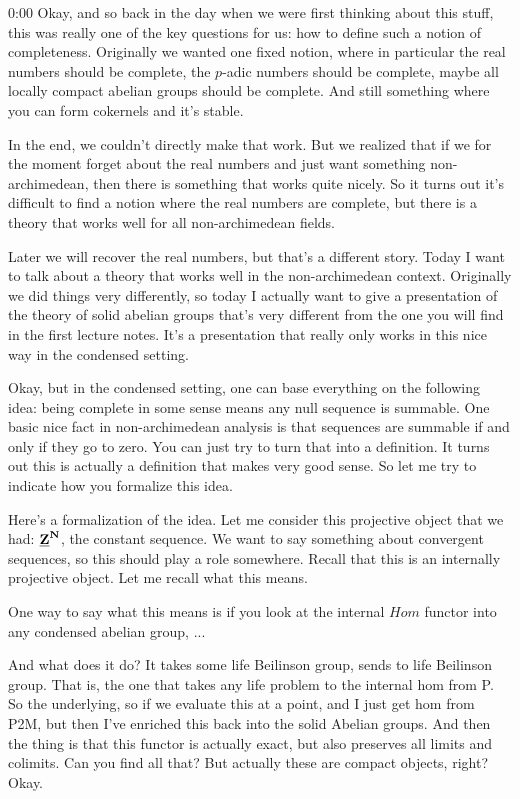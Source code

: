 \begin{unfinished}{0:00}
Okay, and so back in the day when we were first thinking about this stuff, this was really one of the key questions for us: how to define such a notion of completeness. Originally we wanted one fixed notion, where in particular the real numbers should be complete, the $p$-adic numbers should be complete, maybe all locally compact abelian groups should be complete. And still something where you can form cokernels and it's stable.

In the end, we couldn't directly make that work. But we realized that if we for the moment forget about the real numbers and just want something non-archimedean, then there is something that works quite nicely. So it turns out it's difficult to find a notion where the real numbers are complete, but there is a theory that works well for all non-archimedean fields.

Later we will recover the real numbers, but that's a different story. Today I want to talk about a theory that works well in the non-archimedean context. Originally we did things very differently, so today I actually want to give a presentation of the theory of solid abelian groups that's very different from the one you will find in the first lecture notes. It's a presentation that really only works in this nice way in the condensed setting.

Okay, but in the condensed setting, one can base everything on the following idea: being complete in some sense means any null sequence is summable. One basic nice fact in non-archimedean analysis is that sequences are summable if and only if they go to zero. You can just try to turn that into a definition. It turns out this is actually a definition that makes very good sense. So let me try to indicate how you formalize this idea.

Here's a formalization of the idea. Let me consider this projective object that we had: $\underline{\mathbf Z}^\mathbf N$, the constant sequence. We want to say something about convergent sequences, so this should play a role somewhere. Recall that this is an internally projective object. Let me recall what this means.

One way to say what this means is if you look at the internal $Hom$ functor into any condensed abelian group, ...

And what does it do? It takes some life Beilinson group, sends to life Beilinson group. That is, the one that takes any life problem to the internal hom from P. So the underlying, so if we evaluate this at a point, and I just get hom from P2M, but then I've enriched this back into the solid Abelian groups. And then the thing is that this functor is actually exact, but also preserves all limits and colimits. Can you find all that? But actually these are compact objects, right? Okay.


\end{unfinished}
